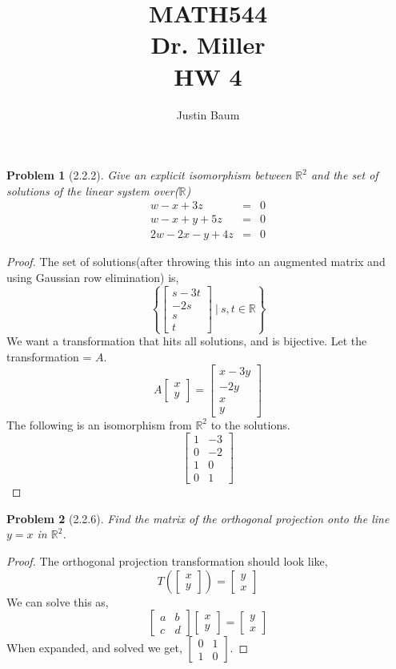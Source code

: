 \documentclass[12pt]{article}   %
\title{MATH544 \\ Dr. Miller \\ HW 4}
\author{Justin Baum}
\newcommand{\R}{\mathbb{R}} %
\newtheorem{problem}{Problem}
\begin{document}
\maketitle

\begin{problem}[2.2.2]
Give an explicit isomorphism between $\R^2$ and the set of solutions of the linear system over($\R$)
\[\begin{array}{ccc}
     w-x+3z&=&0  \\
     w-x+y+5z&=&0 \\
     2w-2x-y+4z&=&0
\end{array}\]
\end{problem}
\begin{proof}
The set of solutions(after throwing this into an augmented matrix and using Gaussian row elimination) is, 
\[\left \{\begin{bmatrix}s-3t\\-2s\\s\\t\end{bmatrix}\ \Bigg |\  s,t\in \R\right \}\] 
We want a transformation that hits all solutions, and is bijective. Let the transformation = $A$.
\[A\begin{bmatrix}x\\y \end{bmatrix}=\begin{bmatrix}x-3y\\-2y\\x\\y\end{bmatrix}\]
The following is an isomorphism from $\R^2$ to the solutions.
\[\begin{bmatrix}1 &-3 \\ 0 & -2 \\ 1 & 0 \\ 0 & 1\end{bmatrix}\]
\end{proof}
\begin{problem}[2.2.6]
Find the matrix of the orthogonal projection onto the line $y=x$ in $\R^2$.
\end{problem}
\begin{proof}
The orthogonal projection transformation should look like,
\[T\left (\begin{bmatrix}x\\y\end{bmatrix}\right)=\begin{bmatrix}y\\x\end{bmatrix}\]
We can solve this as,
\[\begin{bmatrix}a& b \\ c & d\end{bmatrix}\begin{bmatrix}x\\y\end{bmatrix}=\begin{bmatrix}y \\x\end{bmatrix}\]
When expanded, and solved we get, $\begin{bmatrix}0 & 1\\1 & 0\end{bmatrix}$.
\end{proof}
\end{document}
